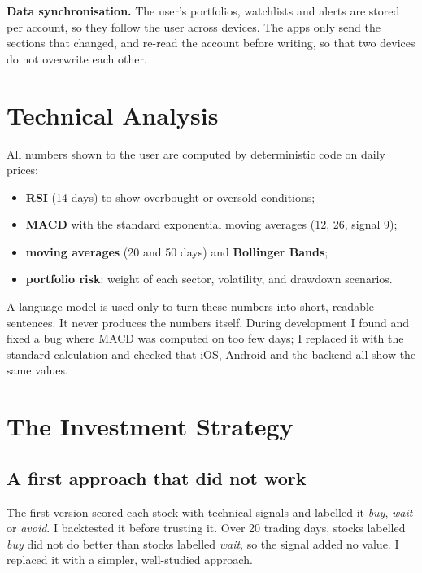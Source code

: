 \documentclass[a4paper,11pt]{article}
\begin{document}
\textbf{Data synchronisation.} The user's portfolios, watchlists and alerts are stored per account, so they follow the user across devices. The apps only send the sections that changed, and re-read the account before writing, so that two devices do not overwrite each other.

\section{Technical Analysis}

All numbers shown to the user are computed by deterministic code on daily prices:
\begin{itemize}
  \item \textbf{RSI} (14 days) to show overbought or oversold conditions;
  \item \textbf{MACD} with the standard exponential moving averages (12, 26, signal 9);
  \item \textbf{moving averages} (20 and 50 days) and \textbf{Bollinger Bands};
  \item \textbf{portfolio risk}: weight of each sector, volatility, and drawdown scenarios.
\end{itemize}
A language model is used only to turn these numbers into short, readable sentences. It never produces the numbers itself. During development I found and fixed a bug where MACD was computed on too few days; I replaced it with the standard calculation and checked that iOS, Android and the backend all show the same values.

\section{The Investment Strategy}\label{sec:strategy}

\subsection*{A first approach that did not work}
The first version scored each stock with technical signals and labelled it \emph{buy}, \emph{wait} or \emph{avoid}. I backtested it before trusting it. Over 20 trading days, stocks labelled \emph{buy} did not do better than stocks labelled \emph{wait}, so the signal added no value. I replaced it with a simpler, well-studied approach.
\end{document}
